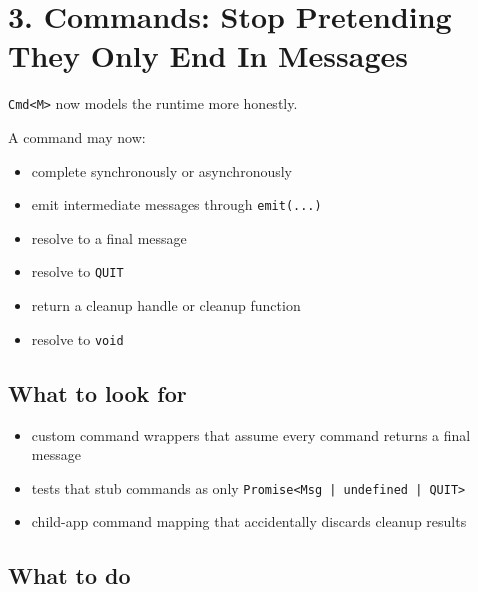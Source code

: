 \section{3. Commands: Stop Pretending They Only End In Messages}\label{record-264-commands-stop-pretending-they-only-end-in-messages}

\texttt{C\allowbreak{}m\allowbreak{}d\allowbreak{}<\allowbreak{}M\allowbreak{}>} now models the runtime more honestly.

A command may now:

\begin{itemize}
\tightlist
\item
  complete synchronously or asynchronously
\item
  emit intermediate messages through \texttt{e\allowbreak{}m\allowbreak{}i\allowbreak{}t\allowbreak{}(\allowbreak{}.\allowbreak{}.\allowbreak{}.\allowbreak{})}
\item
  resolve to a final message
\item
  resolve to \texttt{Q\allowbreak{}U\allowbreak{}I\allowbreak{}T}
\item
  return a cleanup handle or cleanup function
\item
  resolve to \texttt{v\allowbreak{}o\allowbreak{}i\allowbreak{}d}
\end{itemize}

\subsection{What to look for}\label{record-264-what-to-look-for}

\begin{itemize}
\tightlist
\item
  custom command wrappers that assume every command returns a final message
\item
  tests that stub commands as only \texttt{P\allowbreak{}r\allowbreak{}o\allowbreak{}m\allowbreak{}i\allowbreak{}s\allowbreak{}e\allowbreak{}<\allowbreak{}M\allowbreak{}s\allowbreak{}g\allowbreak{} \allowbreak{}|\allowbreak{} \allowbreak{}u\allowbreak{}n\allowbreak{}d\allowbreak{}e\allowbreak{}f\allowbreak{}i\allowbreak{}n\allowbreak{}e\allowbreak{}d\allowbreak{} \allowbreak{}|\allowbreak{} \allowbreak{}Q\allowbreak{}U\allowbreak{}I\allowbreak{}T\allowbreak{}>}
\item
  child-app command mapping that accidentally discards cleanup results
\end{itemize}

\subsection{What to do}\label{record-264-what-to-do}

